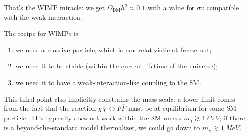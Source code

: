\documentclass[main.tex]{subfiles}
\begin{document}
That's the WIMP miracle: we get \(\Omega _{\text{DM}} h^2 \approx 0.1\)
with a value for \(\sigma v\) compatible with the weak interaction. 

The recipe for WIMPs is 
\begin{enumerate}
    \item we need a massive particle, which is non-relativistic at freeze-out;
    \item we need it to be stable (within the current lifetime of the universe);
    \item we need it to have a weak-interaction-like coupling to the SM.
\end{enumerate}

This third point also implicitly constrains the mass scale: 
a lower limit comes from the fact that the reaction \(\chi \overline{\chi} \leftrightarrow F \overline{F}\)
must be at equilibrium for some SM particle. 
This typically does not work within the SM unless \(m_\chi \gtrsim \SI{1}{GeV}\);
if there is a beyond-the-standard model thermalizer, we could go down to \(m_\chi \gtrsim \SI{1}{MeV}\). 
\end{document}
